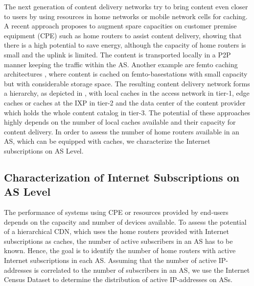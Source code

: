 The next generation of content delivery networks try to bring content even closer to users by using resources in home networks or mobile network cells for caching.
A recent approach \cite{valancius2009greening} proposes to augment spare capacities on customer premise equipment (CPE) such as home routers to assist content delivery, showing that there is a high potential to save energy, although the capacity of home routers is small and the uplink is limited.
The content is transported locally in a P2P manner keeping the traffic within the AS.
Another example are femto caching architectures \cite{golrezaei2013femtocaching}, where content is cached on femto-basestations with small capacity but with considerable storage space.
The resulting content delivery network forms a hierarchy, as depicted in , with local caches in the access network in tier-1, edge caches or caches at the IXP in tier-2 and the data center of the content provider which holds the whole content catalog in tier-3.
The potential of these approaches highly depends on the number of local caches available and their capacity for content delivery.
In order to assess the number of home routers available in an AS, which can be equipped with caches, we characterize the Internet subscriptions on AS Level.

%

\subsection{Characterization of Internet Subscriptions on AS Level}\label{sec:aslevel:census}

The performance of systems using CPE or resources provided by end-users depends on the capacity and number of devices available.
To assess the potential of a hierarchical CDN, which uses the home routers provided with Internet subscriptions as caches, the number of active subscribers in an AS has to be known.
Hence, the goal is to identify the number of home routers with active Internet subscriptions in each AS.
Assuming that the number of active IP-addresses is correlated to the number of subscribers in an AS, we use the Internet Census Dataset to determine the distribution of active IP-addresses on ASs.


